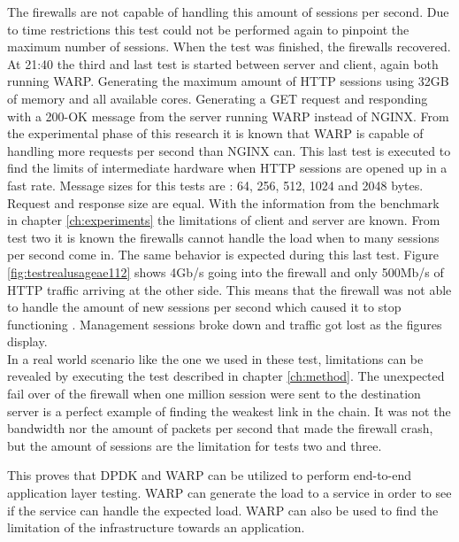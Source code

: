 The firewalls are not capable of handling this amount of sessions per second. Due to time restrictions this test could not be performed again to pinpoint the maximum number of sessions.  
When the test was finished, the firewalls recovered. \\ 

At 21:40 the third and last test is started between server and client, again both running WARP. 
Generating the maximum amount of HTTP sessions using 32GB of memory and all available cores.
Generating a GET request and responding with a 200-OK message from the server running WARP instead of NGINX.  
From the experimental phase of this research it is known that WARP is capable of handling more requests per second than NGINX can. This last test is executed to find the limits of intermediate hardware when HTTP sessions are opened up in a fast rate.
Message sizes for this tests are : 64, 256, 512, 1024 and 2048 bytes. Request and response size are equal. 
With the information from the benchmark in chapter \ref{ch:experiments} the limitations of client and server are known. 
From test two it is known the firewalls cannot handle the load  when to many sessions per second come in. The same behavior is expected during this last test.
Figure \ref{fig:testrealusageae112} shows 4Gb/s going into the firewall and only 500Mb/s of HTTP traffic arriving at the other side.
This means that the firewall was not able to handle the amount of new sessions per second which caused it to stop functioning \cite{forti3200}. 
Management sessions broke down and traffic got lost as the figures display. \\

In a real world scenario like the one we used in these test, limitations can be revealed by executing the test described in chapter \ref{ch:method}. 
The unexpected fail over of the firewall when one million session were sent to the destination server is a perfect example of finding the weakest link in the chain.
It was not the bandwidth nor the amount of packets per second that made the firewall crash, but the amount of sessions are the limitation for tests two and three. 

This proves that DPDK and WARP can be utilized to perform end-to-end application layer testing. 
WARP can generate the load to a service in order to see if the service can handle the expected load. WARP can also be used to find the limitation of the infrastructure towards an application.

